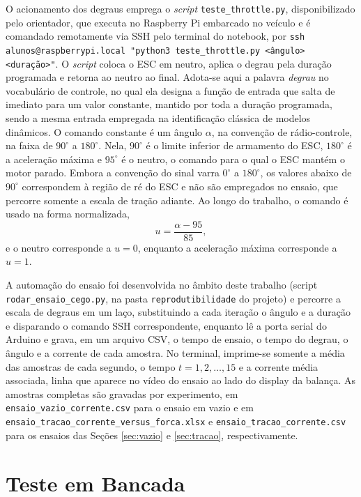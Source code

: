 O acionamento dos degraus emprega o \emph{script} \texttt{teste\_throttle.py},
disponibilizado pelo orientador, que executa no Raspberry Pi embarcado no veículo e é
comandado remotamente via SSH pelo terminal do notebook, por \texttt{ssh
alunos@raspberrypi.local "python3 teste\_throttle.py <ângulo> <duração>"}. O \emph{script}
coloca o ESC em neutro, aplica o degrau pela duração programada e retorna ao neutro ao
final. Adota-se aqui a palavra \emph{degrau} no vocabulário de controle, no qual ela
designa a função de entrada que salta de imediato para um valor constante, mantido por
toda a duração programada, sendo a mesma entrada empregada na identificação clássica de
modelos dinâmicos. O comando constante é um ângulo $\alpha$, na convenção de rádio-controle,
na faixa de $90^\circ$ a $180^\circ$. Nela, $90^\circ$ é o limite inferior de armamento do
ESC, $180^\circ$ é a aceleração máxima e $95^\circ$ é o neutro, o comando para o qual o ESC
mantém o motor parado. Embora a convenção do sinal varra $0^\circ$ a $180^\circ$, os valores
abaixo de $90^\circ$ correspondem à região de ré do ESC e não são empregados no ensaio, que
percorre somente a escala de tração adiante. Ao longo do trabalho, o comando é usado na
forma normalizada,
\begin{equation}\label{eq:normalizacao}
u = \frac{\alpha - 95}{85},
\end{equation}
e o neutro corresponde a $u = 0$, enquanto a aceleração
máxima corresponde a $u = 1$.

A automação do ensaio foi desenvolvida no âmbito deste trabalho (script
\texttt{rodar\_ensaio\_cego.py}, na pasta \texttt{reprodutibilidade} do projeto) e percorre a escala de
degraus em um laço, substituindo a cada iteração o ângulo e a duração e disparando o comando
SSH correspondente, enquanto lê a porta serial do Arduino e grava, em um arquivo CSV,
o tempo de ensaio, o tempo do degrau, o ângulo e a corrente de cada amostra. No terminal, 
imprime-se somente a média das amostras de cada segundo, o
tempo $t = 1, 2, \ldots, 15$ e a corrente média associada, linha que aparece no vídeo do
ensaio ao lado do display da balança. As amostras completas são gravadas por experimento,
em \texttt{ensaio\_vazio\_corrente.csv} para o ensaio em vazio e em
\texttt{ensaio\_tracao\_corrente\_versus\_forca.xlsx} e
\texttt{ensaio\_tracao\_corrente.csv} para os ensaios das Seções
\ref{sec:vazio} e \ref{sec:tracao}, respectivamente.

\section{Teste em Bancada}
\label{sec:bancada}

